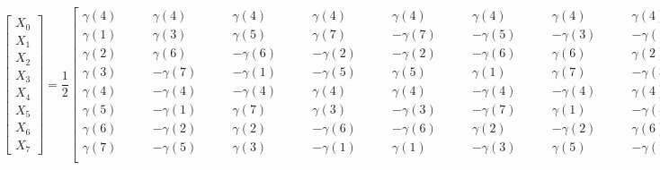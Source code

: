      	\begin{center}
     		\bigskip	
     		$\begin{bmatrix}X_{0}\\ X_{1} \\ X_{2}\\X_{3}\\ X_{4} \\ X_{5} \\X_{6} \\X_{7} \end{bmatrix} = 
     		\dfrac{1}{2}\begin{bmatrix} \gamma(4)  & \gamma(4) &\gamma(4)  & \gamma(4) &\gamma(4)  & \gamma(4) &\gamma(4)  & \gamma(4) \\
     		
     		\gamma(1)  & \gamma(3) &\gamma(5)  & \gamma(7) &-\gamma(7)\qquad  & -\gamma(5)\qquad &-\gamma(3) \qquad & -\gamma(1) \qquad      	\\
     		
     		\gamma(2)  & \gamma(6) &-\gamma(6) \qquad & -\gamma(2) \qquad&-\gamma(2)  & -\gamma(6) &\gamma(6)  & \gamma(2)\\ 
     		
     		\gamma(3)  & -\gamma(7) &-\gamma(1)  & -\gamma(5) &\gamma(5)  & \gamma(1) &\gamma(7)  & -\gamma(3)\\
     		
     		\gamma(4)  & -\gamma(4) &-\gamma(4)  & \gamma(4) &\gamma(4)  & -\gamma(4) &-\gamma(4)  & \gamma(4)\\
     		
     		\gamma(5)  & -\gamma(1) &\gamma(7)  & \gamma(3) &-\gamma(3)  & -\gamma(7) &\gamma(1)  & -\gamma(5)\\
     		
     		\gamma(6)  & -\gamma(2) &\gamma(2)  & -\gamma(6) &-\gamma(6)  & \gamma(2) &-\gamma(2)  & \gamma(6)\\
     		
     		\gamma(7) \qquad & -\gamma(5) \qquad&\gamma(3)  & -\gamma(1) &\gamma(1)  & -\gamma(3) &\gamma(5)  & -\gamma(7)\\   
     		\end{bmatrix} \begin{bmatrix}x_{0}\\ x_{1} \\ x_{2}\\x_{3}\\ x_{4} \\ x_{5} \\x_{6} \\x_{7} \end{bmatrix}$
     		
     	\end{center}
